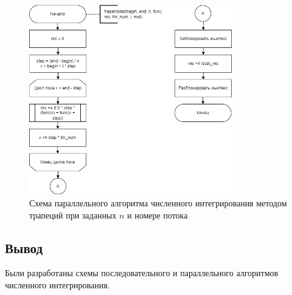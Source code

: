\begin{figure}[h!btp]
	\centering
	\includegraphics[width=250pt]{inc/int_trapez_par.png}
	\caption{Схема параллельного алгоритма численного интегрирования методом трапеций при заданных $n$ и номере потока}
	\label{fig:diagram-int-trapez-par}	
\end{figure}

\subsection*{Вывод}

Были разработаны схемы последовательного и параллельного алгоритмов численного интегрирования.

